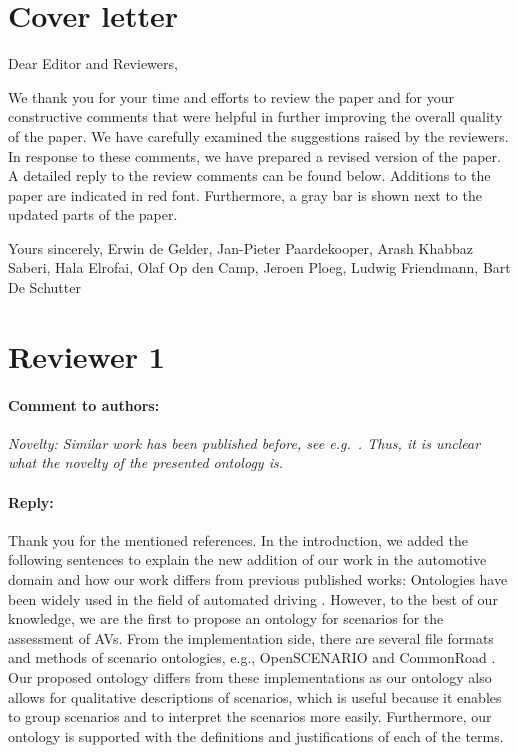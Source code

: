 \documentclass[10pt,final,a4paper,oneside,onecolumn]{article}
\newcommand{\toauthor}{\paragraph*{Comment to authors:} \itshape}
\newcommand{\fromauthor}{\paragraph*{Reply:} \normalfont}
\newcommand{\cstart}{\cbstart\color{red}}
\newcommand{\cend}{\cbend\color{black}}
\begin{document}
	
\section*{Cover letter}

Dear Editor and Reviewers,

We thank you for your time and efforts to review the paper and for your constructive comments that were helpful in further improving the overall quality of the paper. We have carefully examined the suggestions raised by the reviewers. In response to these comments, we have prepared a revised version of the paper. A detailed reply to the review comments can be found below.  Additions to the paper are indicated in \cstart red \cend font. Furthermore, a gray bar is shown next to the updated parts of the paper.

Yours sincerely,
Erwin de Gelder, Jan-Pieter Paardekooper, Arash Khabbaz Saberi, Hala Elrofai, Olaf Op den Camp, Jeroen Ploeg, Ludwig Friendmann, Bart De Schutter


	
\section*{Reviewer 1}

\toauthor Novelty: Similar work has been published before, see e.g.\ \autocite{provine2004ontology, morignot2013ontology, schlenoff2003using, zhao2015core}. Thus, it is unclear what the novelty of the presented ontology is.

\fromauthor Thank you for the mentioned references. In the introduction, we added the following sentences to explain the new addition of our work in the automotive domain and how our work differs from previous published works: 
\cstart Ontologies have been widely used in the field of automated driving \autocite{provine2004ontology, morignot2013ontology, schlenoff2003using, zhao2015core, maiti2017conceptualization, benvenuti2017ontologybased, bagschik2017ontology}. However, to the best of our knowledge, we are the first to propose an ontology for scenarios for the assessment of AVs. 
From the implementation side, there are several file formats and methods of scenario ontologies, e.g., OpenSCENARIO \autocite{openscenario} and CommonRoad \autocite{althoff2017CommonRoad}. Our proposed ontology differs from these implementations as our ontology also allows for qualitative descriptions of scenarios, which is useful because it enables to group scenarios and to interpret the scenarios more easily.
Furthermore, our ontology is supported with the definitions and justifications of each of the terms.\cend
\end{document}
